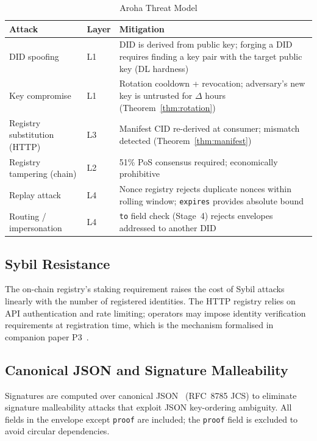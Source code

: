\documentclass[conference]{IEEEtran}
\begin{document}
\begin{table}[t]
\centering
\caption{Aroha Threat Model}
\label{tab:threats}
\renewcommand{\arraystretch}{1.1}
\begin{tabular}{@{}p{2.1cm}p{1.1cm}p{4.5cm}@{}}
\toprule
\textbf{Attack} & \textbf{Layer} & \textbf{Mitigation} \\
\midrule
DID spoofing &
  L1 &
  DID is derived from public key; forging a DID requires
  finding a key pair with the target public key (DL hardness)
  \\[2pt]
Key compromise &
  L1 &
  Rotation cooldown + revocation; adversary's new key is
  untrusted for $\Delta$ hours (Theorem~\ref{thm:rotation})
  \\[2pt]
Registry substitution (HTTP) &
  L3 &
  Manifest CID re-derived at consumer; mismatch detected
  (Theorem~\ref{thm:manifest})
  \\[2pt]
Registry tampering (chain) &
  L2 &
  51\% PoS consensus required; economically prohibitive
  \\[2pt]
Replay attack &
  L4 &
  Nonce registry rejects duplicate nonces within rolling
  window; \texttt{expires} provides absolute bound
  \\[2pt]
Routing / impersonation &
  L4 &
  \texttt{to} field check (Stage~4) rejects envelopes
  addressed to another DID
  \\
\bottomrule
\end{tabular}
\end{table}

\subsection{Sybil Resistance}

The on-chain registry's staking requirement raises the cost
of Sybil attacks~\cite{douceur2002sybil} linearly with the
number of registered identities. The HTTP registry relies on
API authentication and rate limiting; operators may impose
identity verification requirements at registration time, which
is the mechanism formalised in companion paper
P3~\cite{aroha2025p3}.

\subsection{Canonical JSON and Signature Malleability}

Signatures are computed over canonical JSON~\cite{jsoncanon}
(RFC~8785 JCS) to eliminate signature malleability attacks that
exploit JSON key-ordering ambiguity. All fields in the envelope
except \texttt{proof} are included; the \texttt{proof} field is
excluded to avoid circular dependencies.
\end{document}
